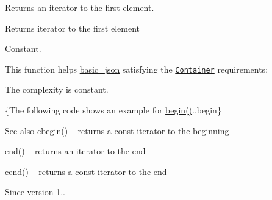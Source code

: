 Returns an iterator to the first element.

 \begin{DoxyReturn}{Returns}
iterator to the first element
\end{DoxyReturn}
Constant.

This function helps {\ttfamily \hyperlink{classnlohmann_1_1basic__json}{basic\+\_\+json}} satisfying the \href{http://en.cppreference.com/w/cpp/concept/Container}{\tt Container} requirements\+:
\begin{DoxyItemize}
\item The complexity is constant.
\end{DoxyItemize}

\{The following code shows an example for {\ttfamily \hyperlink{classnlohmann_1_1basic__json_ad4e381c54039607be08d7af41a1f6ad1}{begin()}}.,begin\}

\begin{DoxySeeAlso}{See also}
\hyperlink{classnlohmann_1_1basic__json_a7355a41b0033ff8a27d58550544d5a59}{cbegin()} -- returns a const \hyperlink{classnlohmann_1_1basic__json_1_1iterator}{iterator} to the beginning 

\hyperlink{classnlohmann_1_1basic__json_a12ccf14d39ddae52f6c7e126105a230b}{end()} -- returns an \hyperlink{classnlohmann_1_1basic__json_1_1iterator}{iterator} to the \hyperlink{classnlohmann_1_1basic__json_a12ccf14d39ddae52f6c7e126105a230b}{end} 

\hyperlink{classnlohmann_1_1basic__json_aa730d68d55ccc48d2cd4835ff46d2a0f}{cend()} -- returns a const \hyperlink{classnlohmann_1_1basic__json_1_1iterator}{iterator} to the \hyperlink{classnlohmann_1_1basic__json_a12ccf14d39ddae52f6c7e126105a230b}{end}
\end{DoxySeeAlso}
\begin{DoxySince}{Since}
version 1.. 
\end{DoxySince}
\hypertarget{classnlohmann_1_1basic__json_af9587bc58ebfac62b2c6b08799f57c2f}{}\label{classnlohmann_1_1basic__json_af9587bc58ebfac62b2c6b08799f57c2f} 

